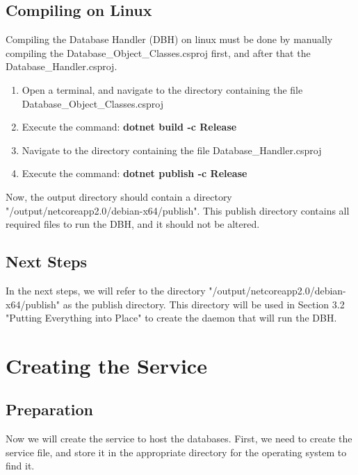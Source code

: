 \documentclass[letterpaper]{article}
\begin{document}
	\subsection{Compiling on Linux}
	Compiling the Database Handler (DBH) on linux must be done by manually compiling the Database\_Object\_Classes.csproj first, and after that the Database\_Handler.csproj. 
	\begin{enumerate}
		\item Open a terminal, and navigate to the directory containing the file Database\_Object\_Classes.csproj
		\item Execute the command: \textbf{dotnet build -c Release}
		\item Navigate to the directory containing the file Database\_Handler.csproj
		\item Execute the command: \textbf{dotnet publish -c Release}
	\end{enumerate}
	Now, the output directory should contain a directory "/output/netcoreapp2.0/debian-x64/publish". This publish directory contains all required files to run the DBH, and it should not be altered.
	
	\subsection{Next Steps}
	In the next steps, we will refer to the directory "/output/netcoreapp2.0/debian-x64/publish" as the publish directory. This directory will be used in Section 3.2 "Putting Everything into Place" to create the daemon that will run the DBH.
	
	\section{Creating the Service}
	
	\subsection{Preparation}
	Now we will create the service to host the databases. First, we need to create the service file, and store it in the appropriate directory for the operating system to find it.
	
\end{document}
